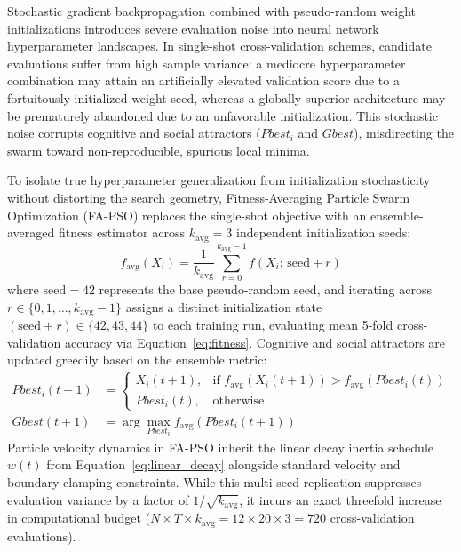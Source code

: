 \documentclass[10pt]{article}
\begin{document}
Stochastic gradient backpropagation combined with pseudo-random weight initializations introduces severe evaluation noise into neural network hyperparameter landscapes. In single-shot cross-validation schemes, candidate evaluations suffer from high sample variance: a mediocre hyperparameter combination may attain an artificially elevated validation score due to a fortuitously initialized weight seed, whereas a globally superior architecture may be prematurely abandoned due to an unfavorable initialization. This stochastic noise corrupts cognitive and social attractors ($Pbest_i$ and $Gbest$), misdirecting the swarm toward non-reproducible, spurious local minima.

To isolate true hyperparameter generalization from initialization stochasticity without distorting the search geometry, Fitness-Averaging Particle Swarm Optimization (FA-PSO) replaces the single-shot objective with an ensemble-averaged fitness estimator across $k_{\mathrm{avg}} = 3$ independent initialization seeds:
\begin{equation}
f_{\mathrm{avg}}(X_i) = \frac{1}{k_{\mathrm{avg}}} \sum_{r=0}^{k_{\mathrm{avg}}-1} f(X_i; \, \mathrm{seed} + r) \label{eq:fa_fitness}
\end{equation}
where $\mathrm{seed} = 42$ represents the base pseudo-random seed, and iterating across $r \in \{0, 1, \dots, k_{\mathrm{avg}}-1\}$ assigns a distinct initialization state $(\mathrm{seed} + r) \in \{42, 43, 44\}$ to each training run, evaluating mean 5-fold cross-validation accuracy via Equation~\eqref{eq:fitness}. Cognitive and social attractors are updated greedily based on the ensemble metric:
\begin{align}
Pbest_i(t+1) &= \begin{cases} X_i(t+1), & \text{if } f_{\mathrm{avg}}(X_i(t+1)) > f_{\mathrm{avg}}(Pbest_i(t)) \\ Pbest_i(t), & \text{otherwise} \end{cases} \label{eq:fa_pbest} \\
Gbest(t+1) &= \arg\max_{Pbest_i} f_{\mathrm{avg}}(Pbest_i(t+1)) \label{eq:fa_gbest}
\end{align}
Particle velocity dynamics in FA-PSO inherit the linear decay inertia schedule $w(t)$ from Equation~\eqref{eq:linear_decay} alongside standard velocity and boundary clamping constraints. While this multi-seed replication suppresses evaluation variance by a factor of $1/\sqrt{k_{\mathrm{avg}}}$, it incurs an exact threefold increase in computational budget ($N \times T \times k_{\mathrm{avg}} = 12 \times 20 \times 3 = 720$ cross-validation evaluations).
\end{document}
